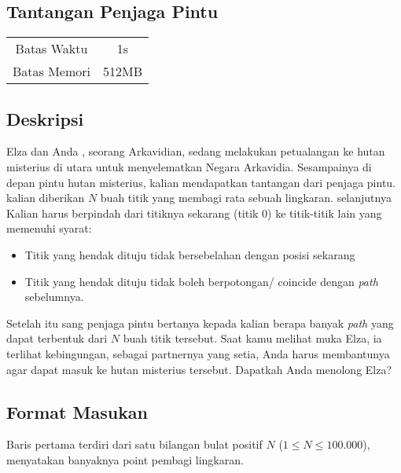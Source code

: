 \documentclass{article}
\begin{document}
\begin{center}
    \section*{Tantangan Penjaga Pintu} %

    \begin{tabular}{ | c c | }
        \hline
        Batas Waktu  & 1s \\    %
        Batas Memori & 512MB \\  %
        \hline
    \end{tabular}
\end{center}

\subsection*{Deskripsi}

Elza dan Anda , seorang Arkavidian, sedang melakukan petualangan ke hutan misterius di utara untuk menyelematkan Negara Arkavidia.
Sesampainya di depan pintu hutan misterius, kalian mendapatkan tantangan dari penjaga pintu.
kalian diberikan $N$ buah titik yang membagi rata sebuah lingkaran. selanjutnya Kalian harus berpindah dari titiknya
sekarang (titik 0) ke titik-titik lain yang memenuhi syarat:

\begin{itemize}
    \setlength\itemsep{0pt}
    \item Titik yang hendak dituju tidak bersebelahan dengan posisi sekarang
    \item Titik yang hendak dituju tidak boleh berpotongan/ coincide dengan \textit{path} sebelumnya.
\end{itemize}

Setelah itu sang penjaga pintu bertanya kepada kalian berapa banyak \textit{path} yang dapat terbentuk dari $N$ buah titik tersebut.
Saat kamu melihat muka Elza, ia terlihat kebingungan, sebagai partnernya yang setia, Anda harus membantunya 
agar dapat masuk ke hutan misterius tersebut. Dapatkah Anda menolong Elza?

\subsection*{Format Masukan}
Baris pertama terdiri dari satu bilangan bulat positif $N$ ($1 \leq N \leq 100.000$), menyatakan banyaknya point pembagi lingkaran.
\end{document}
